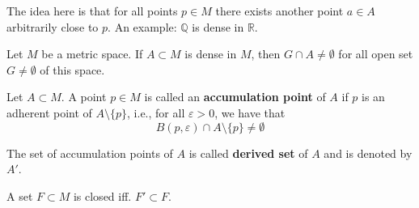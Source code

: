 The idea here is that for all points $p \in M$ there exists another point $a \in A$ arbitrarily close to $p$. An example: $\mathbb{Q}$ is dense in $\mathbb{R}$.

\begin{proposition}
    Let $M$ be a metric space. If $A \subset M$ is dense in $M$, then $G \cap A \neq \emptyset$ for all open set $G \neq \emptyset$ of this space.
\end{proposition}

\begin{definition}
    Let $A \subset M$. A point $p \in M$ is called an \textbf{accumulation point} of $A$ if $p$ is an adherent point of $A \setminus \{ p \}$, i.e., for all $\varepsilon > 0$, we have that
    \[
        B(p, \varepsilon) \cap A \setminus \{ p \} \neq \emptyset
    \]

    The set of accumulation points of $A$ is called \textbf{derived set} of $A$ and is denoted by $A'$.
\end{definition}

\begin{proposition}
    A set $F \subset M$ is closed iff. $F' \subset F$.
\end{proposition}